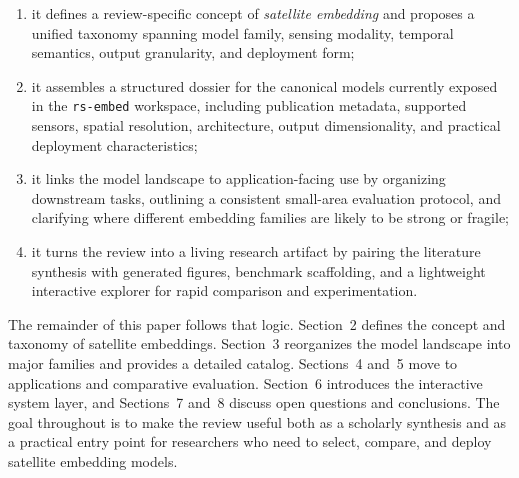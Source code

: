 \begin{enumerate}[leftmargin=1.6em,label=(\roman*)]
  \item it defines a review-specific concept of \emph{satellite embedding} and proposes a unified taxonomy spanning model family, sensing modality, temporal semantics, output granularity, and deployment form;
  \item it assembles a structured dossier for the \modelcount{} canonical models currently exposed in the \texttt{rs-embed} workspace, including publication metadata, supported sensors, spatial resolution, architecture, output dimensionality, and practical deployment characteristics;
  \item it links the model landscape to application-facing use by organizing downstream tasks, outlining a consistent small-area evaluation protocol, and clarifying where different embedding families are likely to be strong or fragile;
  \item it turns the review into a living research artifact by pairing the literature synthesis with generated figures, benchmark scaffolding, and a lightweight interactive explorer for rapid comparison and experimentation.
\end{enumerate}

The remainder of this paper follows that logic. Section~2 defines the concept and taxonomy of satellite embeddings. Section~3 reorganizes the model landscape into major families and provides a detailed catalog. Sections~4 and~5 move to applications and comparative evaluation. Section~6 introduces the interactive system layer, and Sections~7 and~8 discuss open questions and conclusions. The goal throughout is to make the review useful both as a scholarly synthesis and as a practical entry point for researchers who need to select, compare, and deploy satellite embedding models.
